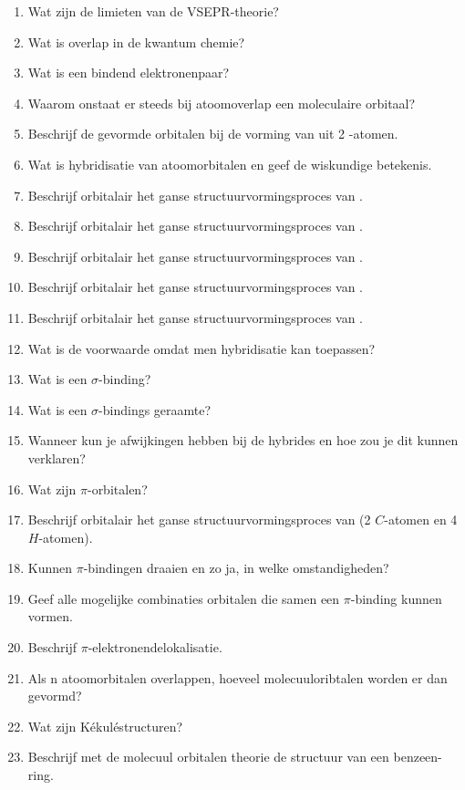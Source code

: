 \documentclass[a4paper,12pt]{article}
\begin{document}
    \begin{enumerate}
        \item Wat zijn de limieten van de VSEPR-theorie?
        \item Wat is overlap in de kwantum chemie?
        \item Wat is een bindend elektronenpaar?
        \item Waarom onstaat er steeds bij atoomoverlap een moleculaire orbitaal?
        \item Beschrijf de gevormde orbitalen bij de vorming van  uit 2 -atomen.
        \item Wat is hybridisatie van atoomorbitalen en geef de wiskundige betekenis.
        \item Beschrijf orbitalair het ganse structuurvormingsproces van .
        \item Beschrijf orbitalair het ganse structuurvormingsproces van .
        \item Beschrijf orbitalair het ganse structuurvormingsproces van .
        \item Beschrijf orbitalair het ganse structuurvormingsproces van . 
        \item Beschrijf orbitalair het ganse structuurvormingsproces van .
        \item Wat is de voorwaarde omdat men hybridisatie kan toepassen?
        \item Wat is een $\sigma$-binding?
        \item Wat is een $\sigma$-bindings geraamte?
        \item Wanneer kun je afwijkingen hebben bij de hybrides en hoe zou je dit kunnen verklaren?
        \item Wat zijn $\pi$-orbitalen?
        \item Beschrijf orbitalair het ganse structuurvormingsproces van  (2 $C$-atomen en 4 $H$-atomen).
        \item Kunnen $\pi$-bindingen draaien en zo ja, in welke omstandigheden?
        \item Geef alle mogelijke combinaties orbitalen die samen een  $\pi$-binding kunnen vormen.
        \item Beschrijf  $\pi$-elektronendelokalisatie.
        \item Als n atoomorbitalen overlappen, hoeveel molecuuloribtalen worden er dan gevormd?
        \item Wat zijn K\'ekul\'estructuren?
        \item Beschrijf met de molecuul orbitalen theorie de structuur van een benzeen-ring.

\end{enumerate}
\end{document}
